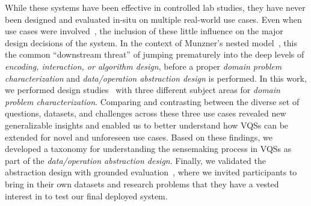   \par While these systems have been effective in controlled lab studies, they have never been designed and evaluated in-situ on multiple real-world use cases. Even when use cases were involved~\cite{Hochheiser2004,correll2016semantics}, the inclusion of these  little influence on the major design decisions of the system. In the context of Munzner's nested model~\cite{munzner2009nested}, this  the common ``downstream threat'' of jumping prematurely into the deep levels of \textit{encoding, interaction, or algorithm design}, before a proper \textit{domain problem characterization} and \textit{data/operation abstraction design} is performed. In this work, we performed design studies~\cite{lam2012empirical,shneiderman2006strategies,Sedlmair2012} with three different subject areas for \textit{domain problem characterization}. Comparing and contrasting between the diverse set of questions, datasets, and challenges across these three use cases revealed new generalizable insights and enabled us to better understand how VQSs can be extended for novel and unforeseen use cases. Based on these findings, we developed a taxonomy for understanding the sensemaking process in VQSs as part of the \textit{data/operation abstraction design}. Finally, we validated the abstraction design with grounded evaluation~\cite{Plaisant2004,Isenberg2008}, where we invited participants to bring in their own datasets and research problems that they have a vested interest in to test our final deployed system. %
